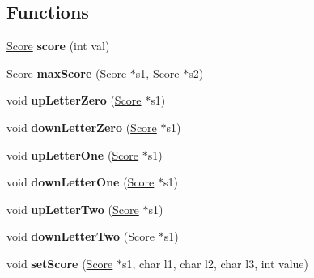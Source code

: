 \subsection*{Functions}
\begin{DoxyCompactItemize}
\item 
\mbox{\label{group__Score_gaf07bc77b15c153a844fc19d581b66fed}} 
\hyperlink{structscore__t}{Score} {\bfseries score} (int val)
\item 
\mbox{\label{group__Score_gabeb635f4fc42a1817ec5aff240aec009}} 
\hyperlink{structscore__t}{Score} {\bfseries max\+Score} (\hyperlink{structscore__t}{Score} $\ast$s1, \hyperlink{structscore__t}{Score} $\ast$s2)
\item 
\mbox{\label{group__Score_gadfa7ef53099142978aba52233c5490a8}} 
void {\bfseries up\+Letter\+Zero} (\hyperlink{structscore__t}{Score} $\ast$s1)
\item 
\mbox{\label{group__Score_gadb9cf8d2e485c201a44369def19b3789}} 
void {\bfseries down\+Letter\+Zero} (\hyperlink{structscore__t}{Score} $\ast$s1)
\item 
\mbox{\label{group__Score_gaf5451f16ab39d3dd97390fdfcd559898}} 
void {\bfseries up\+Letter\+One} (\hyperlink{structscore__t}{Score} $\ast$s1)
\item 
\mbox{\label{group__Score_ga88247c0eb7b9e27a24e4b362a39d7d36}} 
void {\bfseries down\+Letter\+One} (\hyperlink{structscore__t}{Score} $\ast$s1)
\item 
\mbox{\label{group__Score_gac92729da1e937418e77acb5ed329af83}} 
void {\bfseries up\+Letter\+Two} (\hyperlink{structscore__t}{Score} $\ast$s1)
\item 
\mbox{\label{group__Score_gaad1f333c61e05a3619032792df529882}} 
void {\bfseries down\+Letter\+Two} (\hyperlink{structscore__t}{Score} $\ast$s1)
\item 
\mbox{\label{group__Score_ga7997a4cde1b06d6bc5975b90a229e5fe}} 
void {\bfseries set\+Score} (\hyperlink{structscore__t}{Score} $\ast$s1, char l1, char l2, char l3, int value)
\item 

\end{DoxyCompactItemize}

